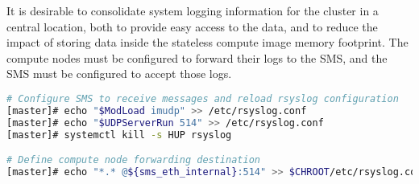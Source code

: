 It is desirable to consolidate system logging information for the cluster in a
central location, both to provide easy access to the data, and to reduce the
impact of storing data inside the stateless compute image memory footprint. The
compute nodes must be configured to forward their logs to the SMS, and the SMS
must be configured to accept those logs.

\begin{lstlisting}[language=bash,keywords={}]
# Configure SMS to receive messages and reload rsyslog configuration
[master]# echo "$ModLoad imudp" >> /etc/rsyslog.conf
[master]# echo "$UDPServerRun 514" >> /etc/rsyslog.conf
[master]# systemctl kill -s HUP rsyslog

# Define compute node forwarding destination
[master]# echo "*.* @${sms_eth_internal}:514" >> $CHROOT/etc/rsyslog.conf
\end{lstlisting}
